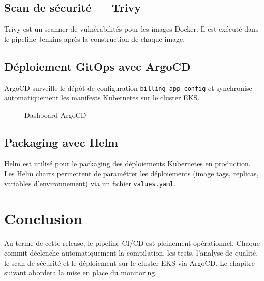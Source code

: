 \subsection{Scan de sécurité --- Trivy}
Trivy est un scanner de vulnérabilités pour les images Docker. Il est exécuté dans le pipeline Jenkins après la construction de chaque image.

\subsection{Déploiement GitOps avec ArgoCD}
ArgoCD surveille le dépôt de configuration \texttt{billing-app-config} et synchronise automatiquement les manifests Kubernetes sur le cluster EKS.

\begin{figure}[H]
    \centering
    \caption{Dashboard ArgoCD}
    \label{fig:argocd}
\end{figure}

\subsection{Packaging avec Helm}
Helm est utilisé pour le packaging des déploiements Kubernetes en production. Les Helm charts permettent de paramétrer les déploiements (image tags, replicas, variables d'environnement) via un fichier \texttt{values.yaml}.

\section*{Conclusion}
Au terme de cette release, le pipeline CI/CD est pleinement opérationnel. Chaque commit déclenche automatiquement la compilation, les tests, l'analyse de qualité, le scan de sécurité et le déploiement sur le cluster EKS via ArgoCD. Le chapitre suivant abordera la mise en place du monitoring.

\newpage
